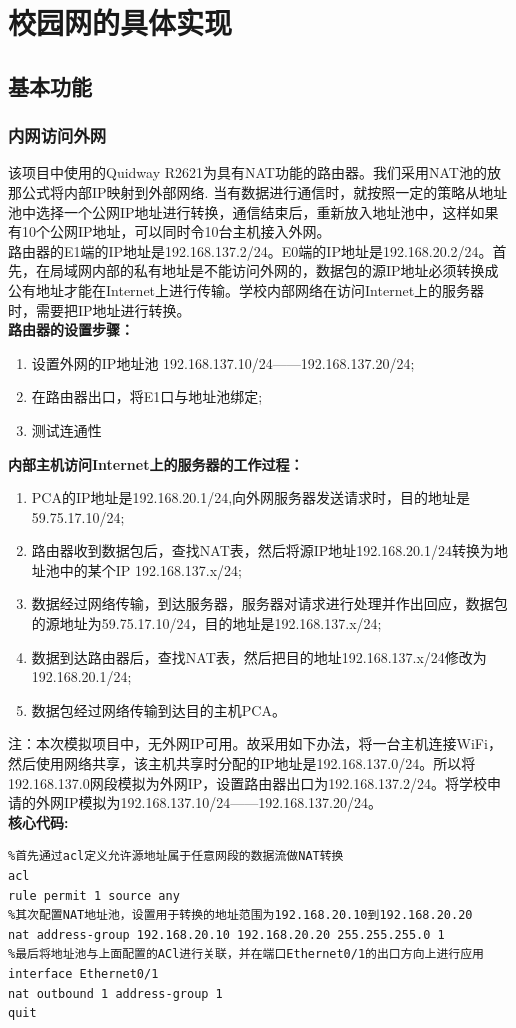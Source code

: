 \section{校园网的具体实现}
\subsection{基本功能}%
	\subsubsection{内网访问外网}
\indent  该项目中使用的Quidway R2621为具有NAT功能的路由器。我们采用NAT池的放那公式将内部IP映射到外部网络. 当有数据进行通信时，就按照一定的策略从地址池中选择一个公网IP地址进行转换，通信结束后，重新放入地址池中，这样如果有10个公网IP地址，可以同时令10台主机接入外网。\\
\indent  路由器的E1端的IP地址是192.168.137.2/24。E0端的IP地址是192.168.20.2/24。首先，在局域网内部的私有地址是不能访问外网的，数据包的源IP地址必须转换成公有地址才能在Internet上进行传输。学校内部网络在访问Internet上的服务器时，需要把IP地址进行转换。\\

\indent \textbf{路由器的设置步骤：} 
\begin{enumerate}
\item 设置外网的IP地址池 192.168.137.10/24——192.168.137.20/24;
\item 在路由器出口，将E1口与地址池绑定;
\item 测试连通性
\end{enumerate}

\indent \textbf{内部主机访问Internet上的服务器的工作过程：}
\begin{enumerate}
\item PCA的IP地址是192.168.20.1/24,向外网服务器发送请求时，目的地址是59.75.17.10/24;
\item 路由器收到数据包后，查找NAT表，然后将源IP地址192.168.20.1/24转换为地址池中的某个IP 192.168.137.x/24;
\item 数据经过网络传输，到达服务器，服务器对请求进行处理并作出回应，数据包的源地址为59.75.17.10/24，目的地址是192.168.137.x/24;
\item 数据到达路由器后，查找NAT表，然后把目的地址192.168.137.x/24修改为192.168.20.1/24;
\item 数据包经过网络传输到达目的主机PCA。
\end{enumerate}
注：本次模拟项目中，无外网IP可用。故采用如下办法，将一台主机连接WiFi，然后使用网络共享，该主机共享时分配的IP地址是192.168.137.0/24。所以将192.168.137.0网段模拟为外网IP，设置路由器出口为192.168.137.2/24。将学校申请的外网IP模拟为192.168.137.10/24——192.168.137.20/24。\\
\indent \textbf{核心代码:}
\begin{lstlisting}
%首先通过acl定义允许源地址属于任意网段的数据流做NAT转换
acl
rule permit 1 source any
%其次配置NAT地址池，设置用于转换的地址范围为192.168.20.10到192.168.20.20
nat address-group 192.168.20.10 192.168.20.20 255.255.255.0 1
%最后将地址池与上面配置的ACl进行关联，并在端口Ethernet0/1的出口方向上进行应用
interface Ethernet0/1
nat outbound 1 address-group 1
quit
\end{lstlisting}
